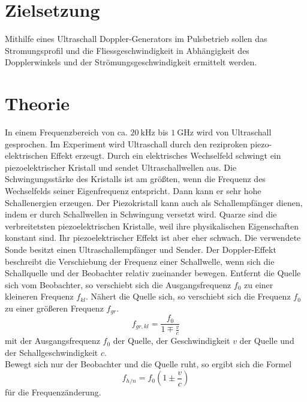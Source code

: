\section{Zielsetzung}
\label{sec:Zielsetzung}

Mithilfe eines Ultraschall Doppler-Generators im Pulsbetrieb sollen das Stromungsprofil und die Fliessgeschwindigkeit
in Abhängigkeit des Dopplerwinkels und der Strömungsgeschwindigkeit ermittelt werden.

\section{Theorie}
\label{sec:Theorie}

In einem Frequenzbereich von ca. $\SI{20}{\kilo\Hz}$ bis $\SI{1}{\giga\Hz}$ wird von Ultraschall gesprochen.
Im Experiment wird Ultraschall durch den reziproken piezo-elektrischen Effekt erzeugt. 
Durch ein elektrisches Wechselfeld schwingt ein piezoelektrischer Kristall und sendet Ultraschallwellen aus.
Die Schwingungsstärke des Kristalls ist am größten, wenn die Frequenz des Wechselfelds seiner Eigenfrequenz entspricht. 
Dann kann er sehr hohe Schallenergien erzeugen. Der Piezokristall kann auch als Schallempfänger dienen, 
indem er durch Schallwellen in Schwingung versetzt wird. Quarze sind die verbreitetsten piezoelektrischen Kristalle, 
weil ihre physikalischen Eigenschaften konstant sind. Ihr piezoelektrischer Effekt ist aber eher schwach.
Die verwendete Sonde besitzt einen Ultraschallempfänger und Sender.
Der Doppler-Effekt beschreibt die Verschiebung der Frequenz einer Schallwelle, wenn sich die Schallquelle und 
der Beobachter relativ zueinander bewegen. 
Entfernt die Quelle sich vom Beobachter, so verschiebt sich die Ausgangsfrequenz $f_0$ zu einer kleineren Frequenz $f_{kl}.$
Nähert die Quelle sich, so verschiebt sich die Frequenz $f_0$ zu einer größeren Frequenz $f_{gr}.$
\begin{equation}\label{eq:Doppler1}
    f_{gr,kl} = \frac{f_0}{1 \mp \frac{v}{c}}%
\end{equation}
mit der Ausgangsfrequenz $f_0$ der Quelle, der Geschwindigkeit $v$ der Quelle und der Schallgeschwindigkeit $c$.\\
Bewegt sich nur der Beobachter und die Quelle ruht, so ergibt sich die Formel
\begin{equation}\label{eq:Doppler2}
    f_{h/n} = f_0 \left(1 \pm \frac{v}{c}\right)
\end{equation}
für die Frequenzänderung.\\

